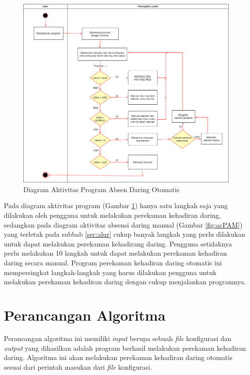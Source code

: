 \begin{figure}[H]
	\centering
	\includegraphics[scale=0.45]{Gambar/ActivityAplikasi.png}
	\caption{Diagram Aktivitas Program Absen Daring Otomatis} 
	\label{fig:ActivityAplikasi}
\end{figure}
\vspace{-0.3cm}
Pada diagram aktivitas program (Gambar \ref{fig:ActivityAplikasi}) hanya satu langkah saja yang dilakukan oleh pengguna untuk melakukan perekaman kehadiran daring, sedangkan pada diagram aktivitas absensi daring manual (Gambar \ref{fig:acPAM}) yang terletak pada subbab \ref{sec:alur} cukup banyak langkah yang perlu dilakukan untuk dapat melakukan perekaman kehadirang daring. Pengguna setidaknya perlu melakukan 10 langkah untuk dapat melakukan perekaman kehadiran daring secara manual. Program perekaman kehadiran daring otomatis ini mempersingkat langkah-langkah yang harus dilakukan pengguna untuk melakukan perekaman kehadiran daring dengan cukup menjalankan programnya.
\vspace{-0.4cm}
\section{Perancangan Algoritma} \vspace{-0.4cm}
Perancangan algoritma ini memiliki \textit{input} berupa sebuah \textit{file} konfigurasi dan \textit{output} yang dihasilkan adalah program berhasil melakukan perekaman kehadiran daring. Algoritma ini akan melakukan perekaman kehadiran daring otomatis sesuai dari perintah masukan dari \textit{file} konfigurasi. 

